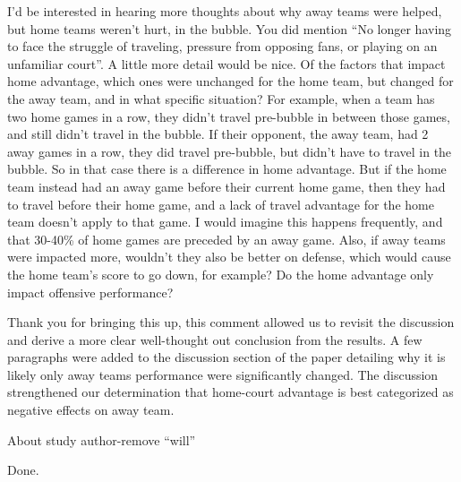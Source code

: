\documentclass[12pt]{article}
\newenvironment{comment}%
{\begin{quoting}\noindent\small\it\ignorespaces%
  }{\end{quoting}}
\begin{document}
\begin{comment}
I’d be interested in hearing more thoughts about why away teams were helped,
but home teams weren’t hurt, in the bubble. You did mention “No longer having
to face the struggle of traveling, pressure from opposing fans, or playing on
an unfamiliar court”. A little more detail would be nice. Of the factors that
impact home advantage, which ones were unchanged for the home team, but
changed for the away team, and in what specific situation?
For example, when a team has two home games in a row, they didn’t travel 
pre-bubble in between those games, and still didn’t travel in the bubble. If 
their opponent, the away team, had 2 away games in a row, they did travel pre-bubble,
but didn’t have to travel in the bubble. So in that case there is a difference in home advantage.
But if the home team instead had an away game before their current home game,
then they had to travel before their home game, and a lack of travel advantage
for the home team doesn’t apply to that game. I would imagine this happens 
frequently, and that 30-40\% of home games are preceded by an away game.
Also, if away teams were impacted more, wouldn’t they also be better on 
defense, which would cause the home team’s score to go down, for example?
Do the home advantage only impact offensive performance?
\end{comment}

 Thank you for bringing this up, this comment allowed us to revisit the discussion 
 and derive a more clear well-thought out conclusion from the results. A few 
 paragraphs were added to the discussion section of the paper detailing why
 it is likely only away teams performance were significantly changed. The 
 discussion strengthened our determination that home-court advantage is best 
 categorized as negative effects on away team.

\begin{comment}
About study author-remove “will”
\end{comment}

Done.




\end{document}
